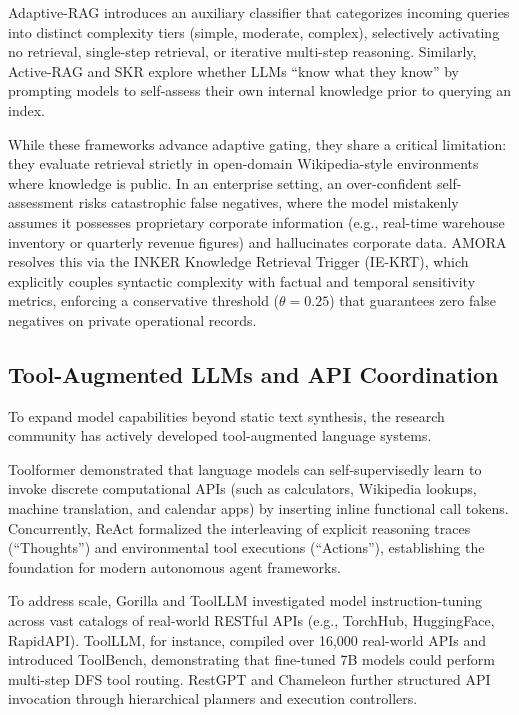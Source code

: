\documentclass[journal,10pt,twocolumn]{IEEEtran}
\begin{document}
Adaptive-RAG \cite{jeong2024adaptiverag} introduces an auxiliary classifier that categorizes incoming queries into distinct complexity tiers (simple, moderate, complex), selectively activating no retrieval, single-step retrieval, or iterative multi-step reasoning. Similarly, Active-RAG and SKR \cite{wang2023skr} explore whether LLMs ``know what they know'' by prompting models to self-assess their own internal knowledge prior to querying an index.

While these frameworks advance adaptive gating, they share a critical limitation: they evaluate retrieval strictly in open-domain Wikipedia-style environments where knowledge is public. In an enterprise setting, an over-confident self-assessment risks catastrophic false negatives, where the model mistakenly assumes it possesses proprietary corporate information (e.g., real-time warehouse inventory or quarterly revenue figures) and hallucinates corporate data. AMORA resolves this via the INKER Knowledge Retrieval Trigger (IE-KRT), which explicitly couples syntactic complexity with factual and temporal sensitivity metrics, enforcing a conservative threshold ($\theta = 0.25$) that guarantees zero false negatives on private operational records.

\subsection{Tool-Augmented LLMs and API Coordination}
To expand model capabilities beyond static text synthesis, the research community has actively developed tool-augmented language systems.

Toolformer \cite{schick2023toolformer} demonstrated that language models can self-supervisedly learn to invoke discrete computational APIs (such as calculators, Wikipedia lookups, machine translation, and calendar apps) by inserting inline functional call tokens. Concurrently, ReAct \cite{yao2022react} formalized the interleaving of explicit reasoning traces (``Thoughts'') and environmental tool executions (``Actions''), establishing the foundation for modern autonomous agent frameworks.

To address scale, Gorilla \cite{patil2023gorilla} and ToolLLM \cite{qin2023toolllm} investigated model instruction-tuning across vast catalogs of real-world RESTful APIs (e.g., TorchHub, HuggingFace, RapidAPI). ToolLLM, for instance, compiled over 16,000 real-world APIs and introduced ToolBench, demonstrating that fine-tuned 7B models could perform multi-step DFS tool routing. RestGPT \cite{song2023restgpt} and Chameleon \cite{lu2023chameleon} further structured API invocation through hierarchical planners and execution controllers.
\end{document}
